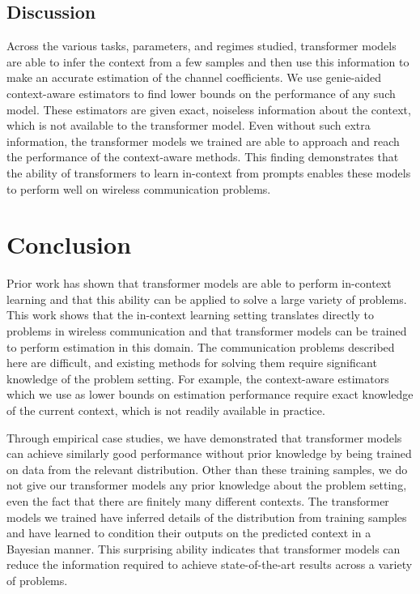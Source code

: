 \documentclass[journal,letterpaper,onecolumn]{IEEEtran}
\begin{document}
\subsection{Discussion}
Across the various tasks, parameters, and regimes studied, transformer models are able to infer the context from a few samples and then use this information to make an accurate estimation of the channel coefficients. We use genie-aided context-aware estimators to find lower bounds on the performance of any such model. These estimators are given exact, noiseless information about the context, which is not available to the transformer model. Even without such extra information, the transformer models we trained are able to approach and reach the performance of the context-aware methods. This finding demonstrates that the ability of transformers to learn in-context from prompts enables these models to perform well on wireless communication problems.

\section{Conclusion}

Prior work has shown that transformer models are able to perform in-context learning and that this ability can be applied to solve a large variety of problems. This work shows that the in-context learning setting translates directly to problems in wireless communication and that transformer models can be trained to perform estimation in this domain. The communication problems described here are difficult, and existing methods for solving them require significant knowledge of the problem setting. For example, the context-aware estimators which we use as lower bounds on estimation performance require exact knowledge of the current context, which is not readily available in practice.

Through empirical case studies, we have demonstrated that transformer models can achieve similarly good performance without prior knowledge by being trained on data from the relevant distribution. Other than these training samples, we do not give our transformer models any prior knowledge about the problem setting, even the fact that there are finitely many different contexts. The transformer models we trained have inferred details of the distribution from training samples and have learned to condition their outputs on the predicted context in a Bayesian manner. 
This surprising ability indicates that transformer models can reduce the information required to achieve state-of-the-art results across a variety of problems.
\end{document}
